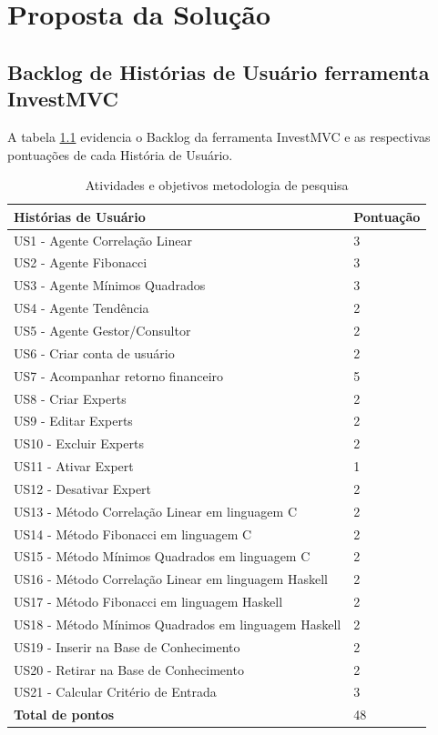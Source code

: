 \chapter{Proposta da Solução}

\section{Backlog de Histórias de Usuário ferramenta InvestMVC}

A tabela \ref{backlog} evidencia o Backlog da ferramenta InvestMVC e as respectivas pontuações de cada História de Usuário.

\begin{table}[htp]
\caption{Atividades e objetivos metodologia de pesquisa}
\begin{center}
    \begin{tabular}{ | p{9cm} | p{5cm} |}
    \hline
    \textbf{Histórias de Usuário} & \textbf{Pontuação} \\ \hline

US1 - Agente Correlação Linear & 3\\ \hline
US2 - Agente Fibonacci & 3 \\ \hline
US3 - Agente Mínimos Quadrados & 3\\ \hline
US4 -  Agente Tendência & 2 \\ \hline
US5 - Agente Gestor/Consultor & 2\\ \hline
US6 - Criar conta de usuário & 2\\ \hline
US7 - Acompanhar retorno financeiro & 5\\ \hline
US8 - Criar Experts & 2\\ \hline
US9 - Editar Experts & 2\\ \hline
US10 - Excluir Experts & 2\\ \hline
US11 - Ativar Expert & 1\\ \hline
US12 - Desativar Expert & 2 \\ \hline
US13 - Método Correlação Linear em linguagem C & 2\\ \hline
US14 - Método Fibonacci em linguagem C & 2\\ \hline
US15 - Método Mínimos Quadrados em linguagem C & 2\\ \hline
US16 - Método Correlação Linear em linguagem Haskell & 2\\ \hline
US17 - Método Fibonacci em linguagem Haskell & 2\\ \hline
US18 - Método Mínimos Quadrados em linguagem Haskell & 2\\ \hline
US19 - Inserir na Base de Conhecimento & 2\\ \hline
US20 - Retirar na Base de Conhecimento & 2\\ \hline
US21 - Calcular Critério de Entrada & 3\\ \hline
\textbf{Total de pontos} & 48\\ \hline
\end{tabular}
\end{center}
\label{backlog}
\end{table}

